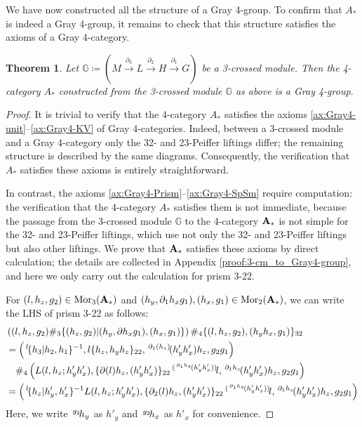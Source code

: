 \documentclass[11pt, reqno]{amsart} %
\newcommand{\act}[1]{\,\sp{#1}\!}
\newcommand{\del}{\partial}
\newcommand{\mor}{{\mathop{\mathrm{Mor}}}}
\newcommand{\bG}{{\mathbb{G}}}
\newtheorem{theorem}{Theorem}[section]
\theoremstyle{definition}
\theoremstyle{remark}
\numberwithin{equation}{section}
\begin{document}
We have now constructed all the structure of a Gray 4-group. To confirm that $A_{*}$ is indeed a Gray 4-group, it remains to check that this structure satisfies the axioms of a Gray 4-category. 
\begin{theorem}
\label{3-cm_to_gray}
Let $\bG \coloneqq ( M\overset{\partial_3}{\longrightarrow}L\overset{\partial_2}{\longrightarrow}H\overset{\partial_1}{\longrightarrow} G)$ be a 3-crossed module. Then the 4-category ${A_{*}}$ constructed from the 3-crossed module $\bG$ as above is a Gray 4-group.
\end{theorem}
\begin{proof}
It is trivial to verify that the 4-category ${A_{*}}$ satisfies the axioms \ref{ax:Gray4-unit}--\ref{ax:Gray4-KV} of Gray 4-categories. Indeed, between a 3-crossed module and a Gray 4-category only the 32- and 23-Peiffer liftings differ; the remaining structure is described by the same diagrams. Consequently, the verification that ${A_{*}}$ satisfies these axioms is entirely straightforward.

In contrast, the axioms \ref{ax:Gray4-Prism}--\ref{ax:Gray4-SpSm} require computation: the verification that the 4-category ${A_{*}}$ satisfies them is not immediate, because the passage from the 3-crossed module $\bG$ to the 4-category ${\bf A_*}$ is not simple for the 32- and 23-Peiffer liftings, which use not only the 32- and 23-Peiffer liftings but also other liftings. We prove that ${\bf A_*}$ satisfies these axioms by direct calculation; the details are collected in Appendix \ref{proof:3-cm_to_Gray4-group}, and here we only carry out the calculation for prism 3-22.

For $(l,h_z, g_2) \in \mor_3({\bf A_*})$ and $(h_y, \del_1 h_x g_1),  (h_x, g_1)\in \mor_2({\bf A_*})$, we can write the LHS of prism 3-22 as follows:
\begin{align}
  \nonumber
  &\left( (l,h_z, g_2)  \#_3\{(h_z, g_2)|(h_y, \del h_x g_1), (h_x, g_1)\} \right) \#_4 \{(l,h_z, g_2), (h_yh_x, g_1)\}_{32} \\
  \nonumber
  &= 
  \left(
    \act{l}\{h_3| h_2, h_1\}^{-1},l\{h_z, h_yh_z\}_{22},\act{\del_1(h_z)}(h'_yh'_x)h_z,g_2g_1
  \right) \\
  \nonumber
  &\quad \#_4
  \left(
    L(l,h_z;h'_yh'_x), \{\del(l)h_z,(h'_yh'_x)\}_{22}\act{(\act{\del_1 h_z}(h'_yh'_x))}l, \act{\del_1 h_z}(h'_yh'_x) h_z, g_2g_1 
  \right) \\
  \label{eq:LHSprism3-22}
  &= 
  \left(
    \act{l}\{h_z| h'_y, h'_x\}^{-1}L(l,h_z;h'_yh'_x), 
    \{\del_2(l)h_z,(h'_yh'_x)\}_{22}\act{(\act{\del_1 h_z}(h'_yh'_x))}l, 
    \act{\del_1 h_z}(h'_yh'_x) h_z, 
    g_2g_1 
  \right)
\end{align}
Here, we write $\act{g_2}h_y$ as $h'_y$ and $\act{g_2}h_x$ as $h'_x$ for convenience.


\end{proof}
\end{document}
